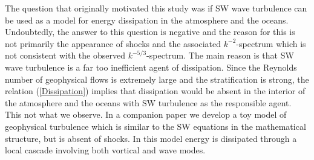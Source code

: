 \documentclass{jfm}
\begin{document}
 
The question that originally motivated this study was if SW wave turbulence can
be used as a model for energy dissipation in the atmosphere and the oceans.
Undoubtedly, the answer to this question is negative and the reason for this is
not primarily the appearance of shocks and the associated $ k^{-2} $-spectrum
which is not consistent with the observed $ k^{-5/3} $-spectrum. The main
reason is that SW wave turbulence is a far too inefficient agent of
dissipation. Since the Reynolds number of geophysical flows is extremely large
and the stratification is strong, the relation (\ref{Dissipation}) implies that
dissipation would be absent in the interior of the atmosphere and the oceans
with SW turbulence as the responsible agent. This not what we observe. In a companion paper \cite[]{LindborgMohanan}
we develop a toy model of geophysical turbulence which is similar to the SW equations in the mathematical structure, but is absent of shocks. 
In this model energy is dissipated through a local cascade involving both vortical and wave modes.
\end{document}
